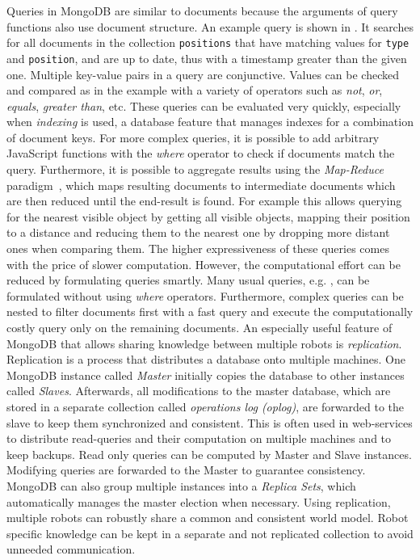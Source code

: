Queries in MongoDB are similar to documents because the arguments of
query functions also use document structure. An example query is shown
in . It searches for all documents in the
collection \texttt{positions} that have matching values for
\texttt{type} and \texttt{position}, and are up to date, thus with a
timestamp greater than the given one. Multiple key-value pairs in a
query are conjunctive.  Values can be checked and compared as in the
example with a variety of operators such as \emph{not}, \emph{or},
\emph{equals}, \emph{greater than}, etc. These queries can be
evaluated very quickly, especially when \emph{indexing} is used, a
database feature that manages indexes for a combination of document
keys. For more complex queries, it is possible to add arbitrary
JavaScript functions with the \emph{where} operator to check if
documents match the query. Furthermore, it is possible to aggregate
results using the \emph{Map-Reduce} paradigm~\cite{mapreduce}, which
maps resulting documents to intermediate documents which are then
reduced until the end-result is found. For example this allows
querying for the nearest visible object by getting all visible
objects, mapping their position to a distance and reducing them to the
nearest one by dropping more distant ones when comparing them.  The
higher expressiveness of these queries comes with the price of slower
computation. However, the computational effort can be reduced by
formulating queries smartly. Many usual queries,
e.g. , can be formulated without using
\emph{where} operators. Furthermore, complex queries can be nested to
filter documents first with a fast query and execute the
computationally costly query only on the remaining documents.
%
An especially useful feature of MongoDB that allows sharing knowledge
between multiple robots is \emph{replication}. Replication is a
process that distributes a database onto multiple machines.  One
MongoDB instance called \emph{Master} initially copies the database to
other instances called \emph{Slaves}.  Afterwards, all modifications
to the master database, which are stored in a separate collection
called \emph{operations log (oplog)}, are forwarded to the slave to
keep them synchronized and consistent.
This is often used
in web-services to distribute read-queries and their computation on
multiple machines and to keep backups.
Read only queries can be computed by Master and Slave
instances. Modifying queries are forwarded to the Master to guarantee
consistency.  MongoDB can also group multiple instances into a
\emph{Replica Sets}, which automatically manages the master election
when necessary. Using replication, multiple robots can robustly share
a common and consistent world model. Robot specific knowledge can be
kept in a separate and not replicated collection to avoid unneeded
communication.

